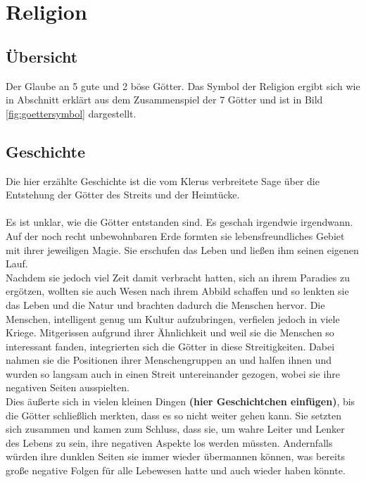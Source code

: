 \chapter{Religion}
\section{Übersicht}
\begin{outline}
	\1 Der Glaube an 5 gute und 2 böse Götter.
	\1 Das Symbol der Religion ergibt sich wie in Abschnitt  erklärt aus dem Zusammenspiel der 7 Götter und ist in Bild \ref{fig:goettersymbol} dargestellt.
\end{outline}

\section{Geschichte}
Die hier erzählte Geschichte ist die vom Klerus verbreitete Sage über die Entstehung der Götter des Streits und der Heimtücke. \\\\
Es ist unklar, wie die Götter entstanden sind. 
Es geschah irgendwie irgendwann. 
Auf der noch recht unbewohnbaren Erde formten sie lebensfreundliches Gebiet mit ihrer jeweiligen Magie. 
Sie erschufen das Leben und ließen ihm seinen eigenen Lauf.\\
Nachdem sie jedoch viel Zeit damit verbracht hatten, sich an ihrem Paradies zu ergötzen, wollten sie auch Wesen nach ihrem Abbild schaffen und so lenkten sie das Leben und die Natur und brachten dadurch die Menschen hervor. 
Die Menschen, intelligent genug um Kultur aufzubringen, verfielen jedoch in viele Kriege. 
Mitgerissen aufgrund ihrer Ähnlichkeit und weil sie die Menschen so interessant fanden, integrierten sich die Götter in diese Streitigkeiten. 
Dabei nahmen sie die Positionen ihrer Menschengruppen an und halfen ihnen und wurden so langsam auch in einen Streit untereinander gezogen, wobei sie ihre negativen Seiten ausspielten.\\
Dies äußerte sich in vielen kleinen Dingen \textbf{(hier Geschichtchen einfügen)}, bis die Götter schließlich merkten, dass es so nicht weiter gehen kann. 
Sie setzten sich zusammen und kamen zum Schluss, dass sie, um wahre Leiter und Lenker des Lebens zu sein, ihre negativen Aspekte los werden müssten. 
Andernfalls würden ihre dunklen Seiten sie immer wieder übermannen können, was bereits große negative Folgen für alle Lebewesen hatte und auch wieder haben könnte.\\
